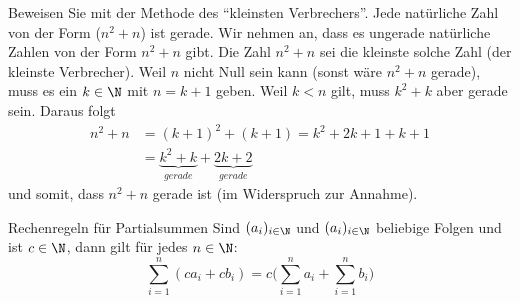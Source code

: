 \begin{example}
	Beweisen Sie mit der Methode des ``kleinsten Verbrechers''.
	Jede natürliche Zahl von der Form ($n^2+n$) ist gerade.
 \tcblower
 Wir nehmen an, dass es ungerade natürliche Zahlen von der Form $n^2+n$ gibt. Die Zahl $n^2+n$ sei die kleinste solche Zahl (der kleinste Verbrecher). Weil $n$ nicht Null sein kann (sonst wäre $n^2+n$ gerade), muss es ein $k\in \N $ mit $n=k+1$ geben. Weil $k<n$ gilt, muss $k^2+k$ aber gerade sein. Daraus folgt
		\begin{align*}
			n^2+n &= (k+1)^2+(k+1)= k^2 + 2k + 1 + k + 1\\
			&= \underbrace{k^2+k}_{gerade}+\underbrace{2k+2}_{gerade}
		\end{align*}
		und somit, dass $n^2+n$ gerade ist (im Widerspruch zur Annahme).
\end{example}

\begin{lemma}{Rechenregeln für Partialsummen}
 Sind $(a_i)_{i\in\N}$ und $(a_i)_{i\in\N}$ beliebige Folgen und ist $c\in\N$, dann gilt für jedes $n\in\N$:
\[
 \sum_{i=1}^n(ca_i+cb_i)=c\big(\sum_{i=1}^na_i+\sum_{i=1}^nb_i\big)
\]
\end{lemma}

